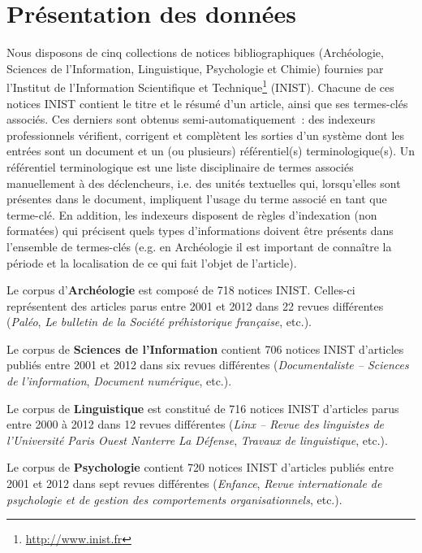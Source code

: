 \section{Présentation des données}
\label{sec:presentation_des_donnees}
  Nous disposons de cinq collections de notices bibliographiques (Archéologie,
  Sciences de l'Information, Linguistique, Psychologie et Chimie) fournies par
  l'Institut de l’Information Scientifique et
  Technique\footnote{\url{http://www.inist.fr}} (INIST). Chacune de ces notices
  INIST contient le titre et le résumé d'un article, ainsi que ses termes-clés
  associés. Ces derniers sont obtenus semi-automatiquement~: des indexeurs
  professionnels vérifient, corrigent et complètent les sorties d'un système
  dont les entrées sont un document et un (ou plusieurs) référentiel(s)
  terminologique(s). Un référentiel terminologique est une liste disciplinaire
  de termes associés manuellement à des déclencheurs, i.e. des unités textuelles
  qui, lorsqu'elles sont présentes dans le document, impliquent l'usage du terme
  associé en tant que terme-clé. En addition, les indexeurs disposent de règles
  d'indexation (non formatées) qui précisent quels types d'informations doivent
  être présents dans l'ensemble de termes-clés (e.g. en Archéologie il est
  important de connaître la période et la localisation de ce qui fait l'objet de
  l'article).

  Le corpus d'\textbf{Archéologie} est composé de 718 notices INIST. Celles-ci
  représentent des articles parus entre 2001 et 2012 dans 22 revues différentes
  (\textit{Paléo}, \textit{Le bulletin de la Société préhistorique française},
  etc.).

  Le corpus de \textbf{Sciences de l'Information} contient 706 notices INIST
  d'articles publiés entre 2001 et 2012 dans six revues différentes
  (\textit{Documentaliste -- Sciences de l'information}, \textit{Document
  numérique}, etc.).

  Le corpus de \textbf{Linguistique} est constitué de 716 notices INIST
  d'articles parus entre 2000 à 2012 dans 12 revues différentes
  (\textit{Linx -- Revue des linguistes de l'Université Paris Ouest Nanterre La
  Défense}, \textit{Travaux de linguistique}, etc.).

  Le corpus de \textbf{Psychologie} contient 720 notices INIST d'articles
  publiés entre 2001 et 2012 dans sept revues différentes
  (\textit{Enfance}, \textit{Revue internationale de psychologie et de gestion
  des comportements organisationnels}, etc.).

